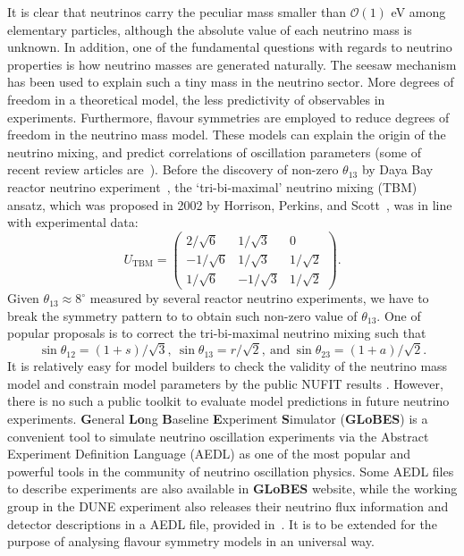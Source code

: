 \documentclass[aps,prd,nofootinbib,preprint]{revtex4}
\begin{document}
It is clear that neutrinos carry the peculiar mass smaller than $\mathcal{O}(1)$ eV among elementary particles, although the absolute value of each neutrino mass is unknown. In addition, one of the fundamental questions with regards to neutrino properties is how neutrino masses are generated naturally. 
The seesaw mechanism has been used to explain such a tiny mass in the neutrino sector. 
More degrees of freedom in a theoretical model, the less predictivity of observables in experiments. Furthermore, flavour symmetries are employed to reduce degrees of freedom in the neutrino mass model. These models can explain the origin of the neutrino mixing, and predict correlations of oscillation parameters (some of recent review articles are~\cite{Altarelli:2010gt,Ishimori:2010au,King:2013eh,King:2014nza,King:2015aea,King:2015ata,King:2017guk}). Before the discovery of non-zero $\theta_{13}$ by Daya Bay reactor neutrino experiment~\cite{An:2013zwz}, the `tri-bi-maximal' neutrino mixing (TBM) ansatz, which was proposed in 2002 by Horrison, Perkins, and Scott~\cite{Harrison:2002er}, was in line with experimental data:
\begin{equation*}
U_{\text{TBM}}=\left(
\begin{array}{ccc}
2/\sqrt{6} & 1/\sqrt{3} & 0\\
-1/\sqrt{6} & 1/\sqrt{3} & 1/\sqrt{2}\\
1/\sqrt{6}  & -1/\sqrt{3} & 1/\sqrt{2}
\end{array}\right).
\end{equation*} 
Given $\theta_{13}\approx 8^\circ$ measured by several reactor neutrino experiments, we have to break the symmetry pattern to to obtain such non-zero value of $\theta_{13}$. One of popular proposals is to correct the tri-bi-maximal neutrino mixing such that 
\begin{equation*}
\sin\theta_{12}=(1+s)/\sqrt{3},~\sin\theta_{13}=r/\sqrt{2},~\text{and}~\sin\theta_{23}=(1+a)/\sqrt{2}.
\end{equation*}
It is relatively easy for model builders to check the validity of the neutrino mass model and constrain model parameters by the public NUFIT results \cite{Esteban:2018azc}. However, there is no such a public toolkit to evaluate model predictions in future neutrino experiments. \textbf{G}eneral \textbf{Lo}ng \textbf{B}aseline \textbf{E}xperiment \textbf{S}imulator (\textbf{GLoBES}) \cite{Huber:2004ka,Huber:2007ji} is a convenient tool to simulate neutrino oscillation experiments via the Abstract Experiment Definition Language (AEDL) as one of the most popular and powerful tools in the community of neutrino oscillation physics. Some AEDL files to describe experiments are also available in \textbf{GLoBES} website, while the working group in the DUNE experiment also releases their neutrino flux information and detector descriptions in a AEDL file, provided in~\cite{Alion:2016uaj}. It is to be extended for the purpose of analysing flavour symmetry models in an universal way. 
\end{document}
